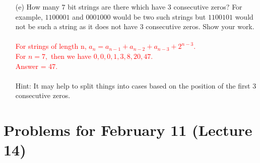 \documentclass[12pt]{article}
\begin{document}
\begin{enumerate}
\item[(e)]How many $7$ bit strings are there which have $3$ consecutive zeros? For example, $1100001$ and $0001000$ would be two such strings but $1100101$ would not be such a string as it does not have $3$ consecutive zeros. Show your work.\\
\\ \textcolor{red}{For strings of length n, $a_n = a_{n-1}+a_{n-2}+a_{n-3}+2^{n-3}$. \\For $n = 7,$ then we have $0,0,0,1,3,8,20,47.$ \\ Answer = 47.}\\
\\
Hint: It may help to split things into cases based on the position of the first $3$ consecutive zeros.
\\ \textcolor{red}{}
\end{enumerate}
\section{Problems for February 11 (Lecture 14)}
\end{document}
